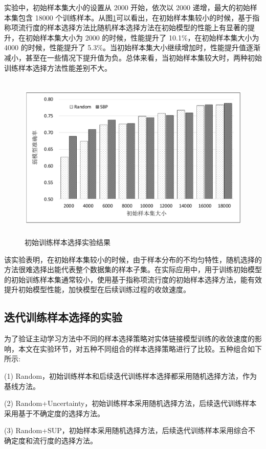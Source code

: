 实验中，初始样本集大小的设置从 2000 开始，依次以 2000 递增，最大的初始样本集包含 18000 个训练样本。从图\ref{fig:al_sup_init_result}可以看出，在初始样本集较小的时候，基于指称项流行度的样本选择方法比随机样本选择方法在初始模型的性能上有显著的提升，在初始样本集大小为 2000 的时候，性能提升了 10.1\%，在初始样本集大小为 4000 的时候，性能提升了 5.3\%。当初始样本集大小继续增加时，性能提升值逐渐减小，甚至在一些情况下提升值为负。总体来看，当初始样本集较大时，两种初始训练样本选择方法性能差别不大。

\begin{figure}[!htb]
	\centering\includegraphics[height=8cm]{resource/surpvised_res1}
	\caption{初始训练样本选择实验结果}
	\label{fig:al_sup_init_result}
\end{figure}

该实验表明，在初始样本集较小的时候，由于样本分布的不均匀特性，随机选择的方法很难选择出能代表整个数据集的样本子集。在实际应用中，用于训练初始模型的初始训练样本集通常较小，使用基于指称项流行度的初始样本选择方法，能有效提升初始模型性能，加快模型在后续训练过程的收敛速度。

\subsection{迭代训练样本选择的实验}
为了验证主动学习方法中不同的样本选择策略对实体链接模型训练的收敛速度的影响，本文在实验环节，对五种不同组合的样本选择策略进行了比较。五种组合如下所示:

(1) Random，初始训练样本和后续迭代训练样本选择都采用随机选择方法，作为基线方法。

(2) Random+Uncertainty，初始训练样本采用随机选择方法，后续迭代训练样本采用基于不确定度的选择方法。

(3) Random+SUP，初始样本采用随机选择方法，后续迭代训练样本采用综合不确定度和流行度的选择方法。

